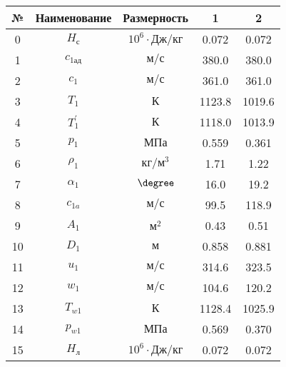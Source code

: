 \begin{center}
    \begin{longtable}{|c|c|c|c|c|}
        \hline
        \textbf{№} &
        \textbf{Наименование} &
        \textbf{Размерность} &
        \textbf{1} &
        \textbf{2} \\\hline
        \endhead
        
        0 & $H_с$ & $10^6 \cdot Дж/кг$ & 0.072 & 0.072 \\\hline
        
        1 & $c_{1ад}$ & $м/с$ & 380.0 & 380.0 \\\hline
        
        2 & $c_{1}$ & $м/с$ & 361.0 & 361.0 \\\hline
        
        3 & $T_1$ & $К$ & 1123.8 & 1019.6 \\\hline
        
        4 & $T_1^\prime$ & $К$ & 1118.0 & 1013.9 \\\hline
        
        5 & $p_1$ & $МПа$ & 0.559 & 0.361 \\\hline
        
        6 & $\rho_1$ & $кг/м^3$ & 1.71 & 1.22 \\\hline
        
        7 & $\alpha_1$ & $\degree$ & 16.0 & 19.2 \\\hline
        
        8 & $c_{1a}$ & $м/с$ & 99.5 & 118.9 \\\hline
        
        9 & $A_1$ & $м^2$ & 0.43 & 0.51 \\\hline
        
        10 & $D_1$ & $м$ & 0.858 & 0.881 \\\hline
        
        11 & $u_1$ & $м/с$ & 314.6 & 323.5 \\\hline
        
        12 & $w_1$ & $м/с$ & 104.6 & 120.2 \\\hline
        
        13 & $T_{w1}$ & $К$ & 1128.4 & 1025.9 \\\hline
        
        14 & $p_{w1}$ & $МПа$ & 0.569 & 0.370 \\\hline
        
        15 & $H_л$ & $10^6 \cdot Дж/кг$ & 0.072 & 0.072 \\\hline
        

\end{longtable}
\end{center}
